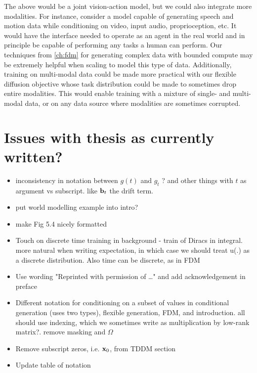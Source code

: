 The above would be a joint vision-action model, but we could also integrate more modalities. For instance, consider a model capable of generating speech and motion data while conditioning on video, input audio, proprioception, etc. It would have the interface needed to operate as an agent in the real world and in principle be capable of performing any tasks a human can perform. Our techniques from \cref{ch:fdm} for generating complex data with bounded compute may be extremely helpful when scaling to model this type of data. Additionally, training on multi-modal data could be made more practical with our flexible diffusion objective whose task distribution could be made to sometimes drop entire modalities. This would enable training with a mixture of single- and multi-modal data, or on any data source where modalities are sometimes corrupted.


\section*{Issues with thesis as currently written?}

\begin{itemize}
    \item inconsistency in notation between $g(t)$ and $g_t$ ? and other things with $t$ as argument vs subscript. like ${\mathbf{b}}_t$ the drift term.
    \item put world modelling example into intro?
    \item make Fig 5.4 nicely formatted
    \item Touch on discrete time training in background - train of Diracs in integral. more natural when writing expectation, in which case we should treat u(.) as a discrete distribution. Also time can be discrete, as in FDM
    \item Use wording "Reprinted with permission of …" and add acknowledgement in preface
    \item Different notation for conditioning on a subset of values in conditional generation (uses two types), flexible generation, FDM, and introduction. all should use indexing, which we sometimes write as multiplication by low-rank matrix?. remove masking and $\Omega$
    \item Remove subscript zeros, i.e. ${\mathbf{x}}_0$, from TDDM section
    \item Update table of notation
\end{itemize}

